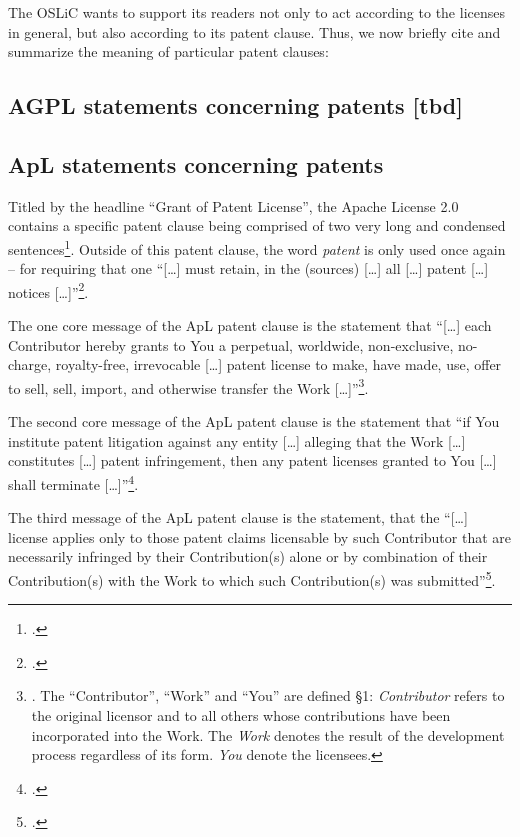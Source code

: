 The OSLiC wants to support its readers not only to act according to the licenses
in general, but also according to its patent clause. Thus, we now briefly cite
and summarize the meaning of particular patent clauses:

\subsection{AGPL statements concerning patents [tbd]}\label{subsec:Agpl30PatentClause}

\subsection{ApL statements concerning patents}\label{subsec:ApLPatentClause}

Titled by the headline \enquote{Grant of Patent License}, the Apache License 2.0
contains a specific patent clause being comprised of two very long and condensed
sentences\footcite[cf.][\nopage wp §3]{Apl20OsiLicense2004a}. Outside of this
patent clause, the word \emph{patent} is only used once again -- for requiring
that one \enquote{[\ldots] must retain, in the (sources) [\ldots] all [\ldots]
patent [\ldots] notices [\ldots]}\footcite[cf.][\nopage wp
§4.3]{Apl20OsiLicense2004a}.

The one core message of the ApL patent clause is the statement that
\enquote{[\ldots] each Contributor hereby grants to You a perpetual, worldwide,
non-exclusive, no-charge, royalty-free, irrevocable [\ldots] patent license to
make, have made, use, offer to sell, sell, import, and otherwise transfer the
Work [\ldots]}\footnote{\cite[cf.][\nopage wp §3]{Apl20OsiLicense2004a}. The \enquote{Contributor},
\enquote{Work} and \enquote{You} are defined §1: \emph{Contributor} refers to
the original licensor and to all others whose contributions have been
incorporated into the Work. The \emph{Work} denotes the result of the
development process regardless of its form. \emph{You} denote the
licensees.}.

The second core message of the ApL patent clause is the statement that
\enquote{if You institute patent litigation against any entity [\ldots] alleging
that the Work [\ldots] constitutes [\ldots] patent infringement, then any patent
licenses granted to You [\ldots] shall terminate [\ldots]}\footcite[cf.][\nopage
wp §3]{Apl20OsiLicense2004a}.

The third message of the ApL patent clause is the statement, that the
\enquote{[\ldots] license applies only to those patent claims licensable by such
Contributor that are necessarily infringed by their Contribution(s) alone or by
combination of their Contribution(s) with the Work to which such Contribution(s)
was submitted}\footcite[cf.][\nopage wp §3]{Apl20OsiLicense2004a}.

